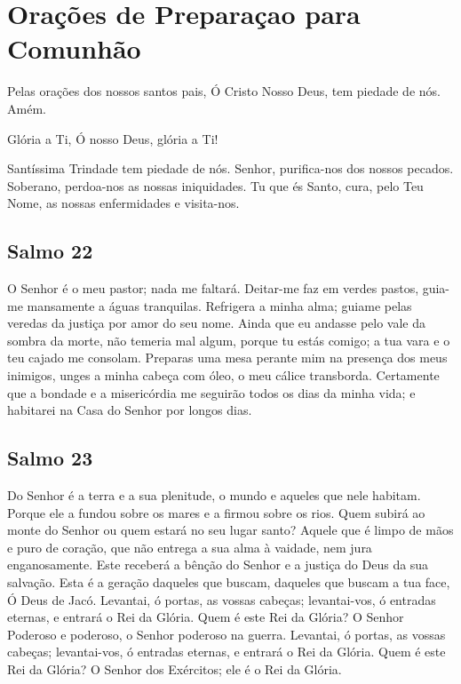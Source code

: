 \documentclass{subfiles}
\begin{document}
\chapter{Orações de Preparaçao para Comunhão}

Pelas orações dos nossos santos pais, Ó Cristo Nosso Deus, tem
piedade de nós. Amém.

Glória a Ti, Ó nosso Deus, glória a Ti!

\comforter{}

\trisagion{} \thrice{}

\Doxology{}

Santíssima Trindade tem piedade de nós. Senhor, purifica-nos dos
nossos pecados. Soberano, perdoa-nos as nossas iniquidades. Tu que és Santo,
cura, pelo Teu Nome, as nossas enfermidades e visita-nos.

\mercy{} \thrice{}

\Doxology{}

\ourFather{}

\mercy{} \thrice{}


\section*{Salmo 22}

O Senhor é o meu pastor; nada me faltará. Deitar-me faz em verdes pastos,
guia-me mansamente a águas tranquilas. Refrigera a minha alma; guiame pelas
veredas da justiça por amor do seu nome. Ainda que eu andasse pelo vale da
sombra da morte, não temeria mal algum, porque tu estás comigo; a tua vara e o
teu cajado me consolam. Preparas uma mesa perante mim na presença dos meus
inimigos, unges a minha cabeça com óleo, o meu cálice transborda. Certamente que
a bondade e a misericórdia me seguirão todos os dias da minha vida; e habitarei
na Casa do Senhor por longos dias.

\section*{Salmo 23}

Do Senhor é a terra e a sua plenitude, o mundo e aqueles que nele habitam.
Porque ele a fundou sobre os mares e a firmou sobre os rios. Quem subirá ao
monte do Senhor ou quem estará no seu lugar santo? Aquele que é limpo de mãos e
puro de coração, que não entrega a sua alma à vaidade, nem jura enganosamente.
Este receberá a bênção do Senhor e a justiça do Deus da sua salvação. Esta é a
geração daqueles que buscam, daqueles que buscam a tua face, Ó Deus de Jacó.
Levantai, ó portas, as vossas cabeças; levantai-vos, ó entradas eternas, e
entrará o Rei da Glória. Quem é este Rei da Glória? O Senhor Poderoso e
poderoso, o Senhor poderoso na guerra. Levantai, ó portas, as vossas cabeças;
levantai-vos, ó entradas eternas, e entrará o Rei da Glória. Quem é este Rei da
Glória? O Senhor dos Exércitos; ele é o Rei da Glória.
\end{document}
